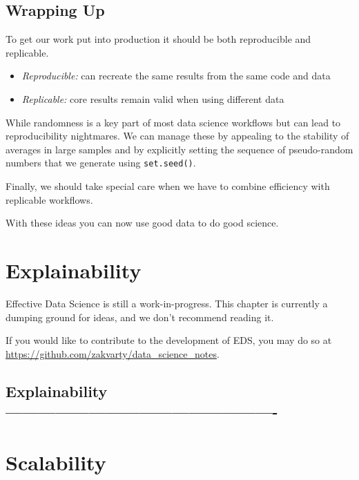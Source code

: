 \documentclass[
  12pt,
]{book}
\begin{document}
\hypertarget{wrapping-up-5}{%
\section{Wrapping Up}\label{wrapping-up-5}}

To get our work put into production it should be both reproducible and replicable.

\begin{itemize}
\item
  \emph{Reproducible:} can recreate the same results from the same code and data
\item
  \emph{Replicable:} core results remain valid when using different data
\end{itemize}

While randomness is a key part of most data science workflows but can lead to reproducibility nightmares. We can manage these by appealing to the stability of averages in large samples and by explicitly setting the sequence of pseudo-random numbers that we generate using \texttt{set.seed()}.

Finally, we should take special care when we have to combine efficiency with replicable workflows.

With these ideas you can now use good data to do good science.

\hypertarget{production-explainability}{%
\chapter{Explainability}\label{production-explainability}}

Effective Data Science is still a work-in-progress. This chapter is currently a dumping ground for ideas, and we don't recommend reading it.

If you would like to contribute to the development of EDS, you may do so at \url{https://github.com/zakvarty/data_science_notes}.

\hypertarget{explainability--}{%
\section{Explainability -------------------------------------------------}\label{explainability--}}

\hypertarget{production-scalability}{%
\chapter{Scalability}\label{production-scalability}}
\end{document}
